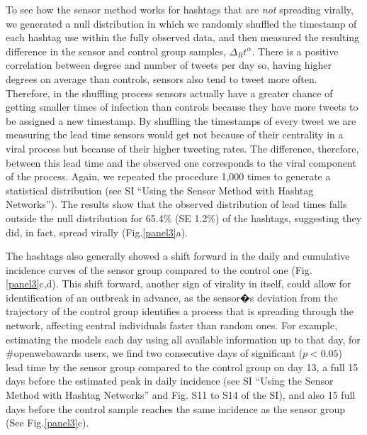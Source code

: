 To see how the sensor method works for hashtags that are {\it not} spreading virally, we generated a null distribution in which we randomly shuffled the timestamp of each hashtag use within the fully observed data, and then measured the resulting difference in the sensor and control group samples,  $\Delta _R t^\alpha$.  There is a positive correlation between degree and number of tweets per day so, having higher degrees on average than controls, sensors also tend to tweet more often. Therefore, in the shuffling process sensors actually have a greater chance of getting smaller times of infection than controls because they have more tweets to be assigned a new timestamp.  By shuffling the timestamps of every tweet we are measuring the lead time sensors would get not because of their centrality in a viral process but because of their higher tweeting rates. The difference, therefore, between this lead time and the observed one corresponds to the viral component of the process. Again, we repeated the procedure 1,000 times to generate a statistical distribution (see SI ``Using the Sensor Method with Hashtag Networks'').  The results show that the observed distribution of lead times falls outside the null distribution for 65.4\% (SE 1.2\%) of the hashtags, suggesting they did, in fact, spread virally (Fig.\ref{panel3}a).

The hashtags also generally showed a shift forward in the daily and cumulative incidence curves of the sensor group compared to the control one (Fig.\ref{panel3}c,d).  This shift forward, another sign of virality in itself, could allow for identification of an outbreak in advance, as the sensor�s deviation from the trajectory of the control group identifies a process that is spreading through the network, affecting central individuals faster than random ones. For example, estimating the models each day using all available information up to that day, for \#openwebawards users, we find two consecutive days of significant ($p<0.05$) lead time by the sensor group compared to the control group on day 13, a full 15 days before the estimated peak in daily incidence (see SI ``Using the Sensor Method with Hashtag Networks'' and Fig. S11 to S14 of the SI), and also 15 full days before the control sample reaches the same incidence as the sensor group (See Fig.\ref{panel3}c).  

